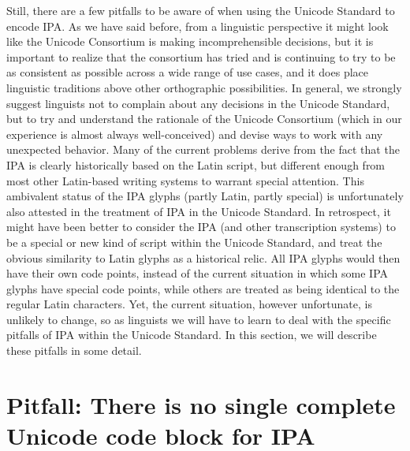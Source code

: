 Still, there are a few pitfalls to be aware of when using the Unicode Standard
to encode IPA. As we have said before, from a linguistic perspective it might
look like the Unicode Consortium is making incomprehensible decisions, but it is
important to realize that the consortium has tried and is continuing to try to
be as consistent as possible across a wide range of use cases, and it does place
linguistic traditions above other orthographic possibilities. In general, we
strongly suggest linguists not to complain about any decisions in the Unicode
Standard, but to try and understand the rationale of the Unicode Consortium
(which in our experience is almost always well-conceived) and devise ways to
work with any unexpected behavior. Many of the current problems derive from the
fact that the IPA is clearly historically based on the Latin script, but
different enough from most other Latin-based writing systems to warrant special
attention. This ambivalent status of the IPA glyphs (partly Latin, partly
special) is unfortunately also attested in the treatment of IPA in the Unicode
Standard. In retrospect, it might have been better to consider the IPA (and
other transcription systems) to be a special or new kind of script within the
Unicode Standard, and treat the obvious similarity to Latin glyphs as a
historical relic. All IPA glyphs would then have their own code points, instead
of the current situation in which some IPA glyphs have special code points,
while others are treated as being identical to the regular Latin characters.
Yet, the current situation, however unfortunate, is unlikely to change, so as
linguists we will have to learn to deal with the specific pitfalls of IPA within
the Unicode Standard. In this section, we will describe these pitfalls in some
detail.

\section{Pitfall: There is no single complete Unicode code block for IPA}
\label{pitfall-there-is-no-single-complete-unicode-code-block-for-ipa}

